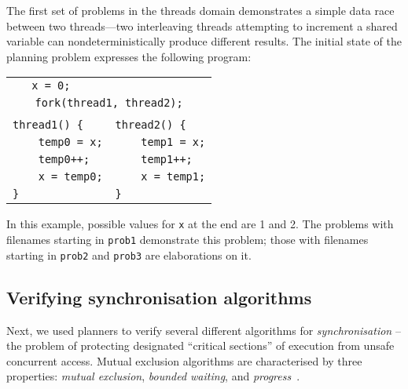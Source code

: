 The first set of problems in the threads domain demonstrates a simple data race between two threads---two interleaving threads attempting to increment a shared variable can nondeterministically produce different results. The initial state of the planning problem expresses the following program:
%
	\begin{center} \small
	\begin{tabular}{ll}
	\multicolumn{2}{c}{\texttt{x = 0;~~~~~~~~~~~~~~~~~~}} \\
	\multicolumn{2}{c}{\texttt{fork(thread1, thread2);}} \\
	& \\
	\texttt{thread1() \{} & \texttt{thread2() \{} \\
	\texttt{~~~~temp0 = x;\qquad} & \texttt{~~~~temp1 = x;} \\
	\texttt{~~~~temp0++;} & \texttt{~~~~temp1++;} \\
	\texttt{~~~~x = temp0;} & \texttt{~~~~x = temp1;} \\
	\texttt{\}} & \texttt{\}} \\
	\end{tabular}
	\end{center}
%
In this example, possible values for \texttt{x} at the end are 1 and 2. The problems with filenames starting in \texttt{prob1} demonstrate this problem; those with filenames starting in \texttt{prob2} and \texttt{prob3} are elaborations on it.

\subsection{Verifying synchronisation algorithms}

Next, we used planners to verify several different algorithms for {\em synchronisation} -- the problem of protecting designated ``critical sections'' of execution from unsafe concurrent access. Mutual exclusion algorithms are characterised by three properties: {\em mutual exclusion}, {\em bounded waiting}, and {\em progress}~\cite{de0u}.

